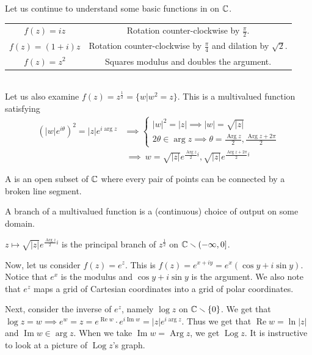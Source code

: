 \documentclass[11pt,leqno,oneside]{amsart}
\numberwithin{thm}{section}
\newcommand{\Arg}{\operatorname{Arg}}
\newcommand{\Log}{\operatorname{Log}}
\renewcommand{\Re}{\operatorname{Re}}
\renewcommand{\Im}{\operatorname{Im}}
\begin{document}
Let us continue to understand some basic functions in on ${\mathbb C}$. \\
\begin{tabular}{|c|c|}
    \hline
    $f(z) = iz$ & Rotation counter-clockwise by $\frac{\pi}{2}$. \\
    $f(z) = (1+i)z$ & Rotation counter-clockwise by $\frac{\pi}{4}$ and dilation by $\sqrt{2}$. \\
    $f(z) = z^2$ & Squares modulus and doubles the argument. \\
   \hline
\end{tabular} \\
Let us also examine $f(z) = z^{\frac{1}{2}} = \{w | w^2=z\}$. This is a multivalued function satisfying
\begin{align*}
    (|w|e^{i\theta})^2 = |z|e^{i \arg z} & \implies \begin{cases}
        |w|^2 = |z| \implies |w| = \sqrt{|z|} \\
        2\theta \in \arg z \implies \theta = \frac{\Arg z}{2}, \frac{\Arg z + 2\pi}{2}
    \end{cases} \\
    \ & \ \implies \ w = \sqrt{|z|}e^{\frac{\Arg z}{2}i}, \sqrt{|z|}e^{\frac{\Arg z + 2\pi}{2} i}
\end{align*}
\begin{defn}
    A  is an open subset of ${\mathbb C}$ where every pair of points can be connected by a broken line segment.
\end{defn}
\begin{defn}
    A branch of a multivalued function is a (continuous) choice of output on some domain.
\end{defn}
\begin{example}
    $z \mapsto \sqrt{|z|}e^{\frac{\Arg z}{2}i}$ is the principal branch of
    $z^{\frac{1}{2}}$ on ${\mathbb C} \smallsetminus (-\infty,0]$.
\end{example}

Now, let us consider $f(z) = e^z$. This is $f(z) = e^{x+iy} = e^x(\cos y +
i\sin y)$. Notice that $e^x$ is the modulus and $\cos y + i \sin y$ is the
argument. We also note that $e^z$ maps a grid of Cartesian coordinates into a
grid of polar coordinates.

Next, consider the inverse of $e^z$, namely $\log z$ on ${\mathbb C} \smallsetminus
\{0\}$. We get that $\log z = w \implies e^w = z = e^{\Re w} \cdot e^{i \Im w}
= |z|e^{i \arg z}$. Thus we get that $\Re w = \ln|z|$ and $\Im w \in \arg z$.
When we take $\Im w = \Arg z$, we get $\Log z$. It is instructive to look at a
picture of $\Log z$'s graph.
\end{document}
